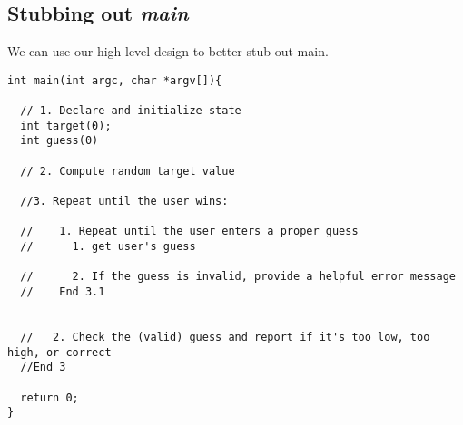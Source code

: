 \documentclass[]{tufte-handout}
\begin{document}
\subsection{Stubbing out \textit{main}} 

We can use our high-level design to better stub out main.
\begin{verbatim}
int main(int argc, char *argv[]){

  // 1. Declare and initialize state
  int target(0);
  int guess(0)

  // 2. Compute random target value

  //3. Repeat until the user wins:

  //    1. Repeat until the user enters a proper guess
  //      1. get user's guess
     
  //      2. If the guess is invalid, provide a helpful error message
  //    End 3.1
  
  
  //   2. Check the (valid) guess and report if it's too low, too high, or correct 
  //End 3

  return 0;
}
\end{verbatim}
\end{document}
